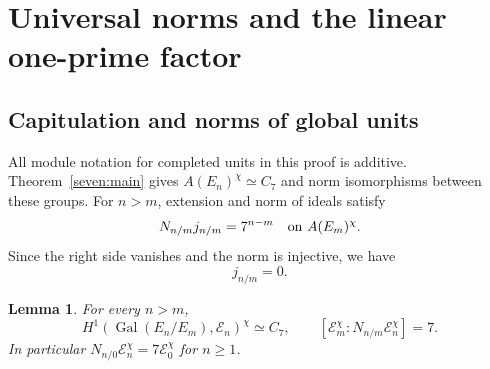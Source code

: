 \documentclass[11pt]{article}
\newtheorem{lemma}[theorem]{Lemma}
\begin{document}
\section{Universal norms and the linear one-prime factor}
\subsection{Capitulation and norms of global units}

All module notation for completed units in this proof is additive.
Theorem~\ref{seven:main} gives
$A(E_n)^\chi\simeq C_7$ and norm isomorphisms between these groups.
For $n>m$, extension and norm of ideals satisfy
\[
 N_{n/m}j_{n/m}=7^{n-m}
 \quad\hbox{on } A(E_m)^\chi.
\]
Since the right side vanishes and the norm is injective, we have
\begin{equation*}\tag{U3}\label{seven:faithful-capitulation}
 j_{n/m}=0.
\end{equation*}

\begin{lemma}\label{seven:unit-norm-index}
For every $n>m$,
\[
 H^1(\operatorname{Gal}(E_n/E_m),\mathcal E_n)^\chi\simeq C_7,
 \qquad
 [\mathcal E_m^\chi:N_{n/m}\mathcal E_n^\chi]=7.
\]
In particular
$N_{n/0}\mathcal E_n^\chi=7\mathcal E_0^\chi$ for $n\ge1$.
\end{lemma}
\end{document}
